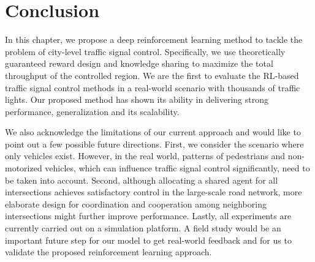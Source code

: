 \section{Conclusion}

In this chapter, we propose a deep reinforcement learning method to tackle the problem of city-level traffic signal control. Specifically, we use theoretically guaranteed reward design and knowledge sharing to maximize the total throughput of the controlled region. We are the first to evaluate the RL-based traffic signal control methods in a real-world scenario with thousands of traffic lights. Our proposed method has shown its ability in delivering strong performance, generalization and its scalability.

We also acknowledge the limitations of our current approach and would like to point out a few possible future directions. First, we consider the scenario where only vehicles exist. However, in the real world, patterns of pedestrians and non-motorized vehicles, which can influence traffic signal control significantly, need to be taken into account. Second, although allocating a shared agent for all intersections achieves satisfactory control in the large-scale road network, more elaborate design for coordination and cooperation among neighboring intersections might further improve performance. Lastly, all experiments are currently carried out on a simulation platform. A field study would be an important future step for our model to get real-world feedback and for us to validate the proposed reinforcement learning approach.

  

